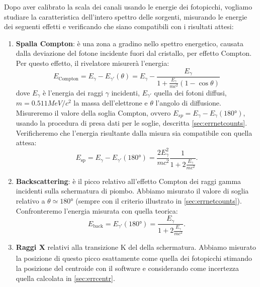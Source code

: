 Dopo aver calibrato la scala dei canali usando le energie dei fotopicchi, vogliamo studiare la caratteristica dell'intero spettro delle sorgenti, misurando le energie dei seguenti effetti e verificando che siano compatibili con i risultati attesi:
\begin{enumerate}
\item {\bf Spalla Compton}: è una zona a gradino nello spettro energetico, causata dalla deviazione del fotone incidente fuori dal cristallo, per effetto Compton.\\
Per questo effetto, il rivelatore misurerà l'energia: 
\begin{equation}
E_{\text{Compton}} = E_ \gamma - E_ {\gamma'}(\theta) = E_ \gamma - \frac{E_ \gamma}{1+\frac{E_ \gamma}{mc^2} (1 - \cos\theta)}
\end{equation}
dove $ E_{\gamma} $ è l'energia dei raggi $ \gamma $ incidenti, $ E_{\gamma'} $ quella dei fotoni diffusi, $ m = 0.511 \unit{MeV/c^2} $ la massa dell'elettrone e $ \theta $ l'angolo di diffusione. \\
Misureremo il valore della soglia Compton, ovvero $E_{sp} = E_ \gamma - E_ \gamma(\ang{180})$, usando la procedura di presa dati per le soglie, descritta \cref{sec:errnetcounts}. 
Verificheremo che l'energia risultante dalla misura sia compatibile con quella attesa:
\begin{equation} \label{eq:E_sp}
E_{\text{sp}} =  E_ \gamma - E_ {\gamma'}(\ang{180}) = \frac{2E_ \gamma ^2}{mc^2} \frac{1}{1+2 \frac{E_ \gamma}{mc^2}}.
\end{equation}
  
\item {\bf Backscattering}: è il picco relativo all'effetto Compton dei raggi gamma incidenti sulla schermatura di piombo. Abbiamo misurato il valore di soglia relativo a  $\theta \simeq \ang{180}$ (sempre con il criterio illustrato in \cref{sec:errnetcounts}).
Confronteremo l'energia misurata con quella teorica:
\begin{equation} \label{eq:back}
E_{\text{back}} = E_{ \gamma'}(\ang{180}) = \frac{E_ \gamma}{1+2 \frac{E_ \gamma}{mc^2}}.
\end{equation}

\item {\bf Raggi X} relativi alla transizione \unit{K_{\alpha}} del  della schermatura. Abbiamo misurato la posizione di questo picco esattamente come quella dei fotopicchi stimando la posizione del centroide con il software e considerando come incertezza quella calcolata in \cref{sec:errcentr}. 
\end{enumerate}

